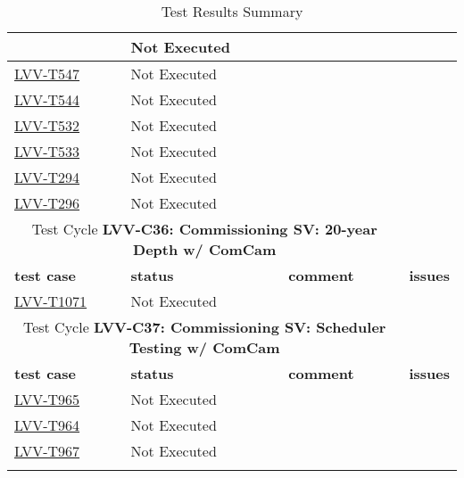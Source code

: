 \documentclass[DM,lsstdraft,STR,toc]{lsstdoc}
\begin{document}
\begin{longtable}{p{}p{}p{}p{}}
    & Not Executed &  &
    \\\hline
    \href{https://jira.lsstcorp.org/secure/Tests.jspa#/testCase/LVV-T547}{LVV-T547}
    & Not Executed &  &
    \\\hline
    \href{https://jira.lsstcorp.org/secure/Tests.jspa#/testCase/LVV-T544}{LVV-T544}
    & Not Executed &  &
    \\\hline
    \href{https://jira.lsstcorp.org/secure/Tests.jspa#/testCase/LVV-T532}{LVV-T532}
    & Not Executed &  &
    \\\hline
    \href{https://jira.lsstcorp.org/secure/Tests.jspa#/testCase/LVV-T533}{LVV-T533}
    & Not Executed &  &
    \\\hline
    \href{https://jira.lsstcorp.org/secure/Tests.jspa#/testCase/LVV-T294}{LVV-T294}
    & Not Executed &  &
    \\\hline
    \href{https://jira.lsstcorp.org/secure/Tests.jspa#/testCase/LVV-T296}{LVV-T296}
    & Not Executed &  &
    \\\hline

  \multicolumn{3}{c}{ Test Cycle {\bf LVV-C36: Commissioning SV: 20-year Depth w/ ComCam
 }} \\\hline

  {\bf \footnotesize test case} & {\bf \footnotesize status} & {\bf \footnotesize comment} & {\bf \footnotesize issues} \\\toprule

    \href{https://jira.lsstcorp.org/secure/Tests.jspa#/testCase/LVV-T1071}{LVV-T1071}
    & Not Executed &  &
    \\\hline

  \multicolumn{3}{c}{ Test Cycle {\bf LVV-C37: Commissioning SV: Scheduler Testing w/ ComCam
 }} \\\hline

  {\bf \footnotesize test case} & {\bf \footnotesize status} & {\bf \footnotesize comment} & {\bf \footnotesize issues} \\\toprule

    \href{https://jira.lsstcorp.org/secure/Tests.jspa#/testCase/LVV-T965}{LVV-T965}
    & Not Executed &  &
    \\\hline
    \href{https://jira.lsstcorp.org/secure/Tests.jspa#/testCase/LVV-T964}{LVV-T964}
    & Not Executed &  &
    \\\hline
    \href{https://jira.lsstcorp.org/secure/Tests.jspa#/testCase/LVV-T967}{LVV-T967}
    & Not Executed &  &
    \\\hline

\caption{Test Results Summary}
\label{table:summary}
\end{longtable}
\end{document}
